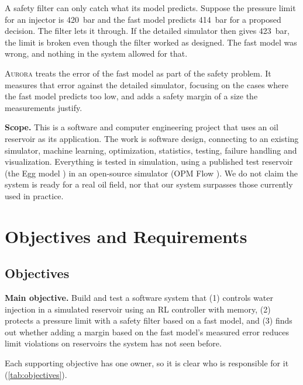 \documentclass[11pt,letterpaper]{article}
\newcommand{\aur}{\textsc{Aurora}}
\begin{document}
\begin{keybox}[title=The problem this project addresses.]
A safety filter can only catch what its model predicts. Suppose the pressure limit for an
injector is \SI{420}{\bar} and the fast model predicts \SI{414}{\bar} for a proposed
decision. The filter lets it through. If the detailed simulator then gives \SI{423}{\bar},
the limit is broken even though the filter worked as designed. The fast model was wrong,
and nothing in the system allowed for that.
\end{keybox}

\aur{} treats the error of the fast model as part of the safety problem. It measures that
error against the detailed simulator, focusing on the cases where the fast model predicts
too low, and adds a safety margin of a size the measurements justify.

\textbf{Scope.} This is a software and computer engineering project that uses an oil
reservoir as its application. The work is software design, connecting to an existing
simulator, machine learning, optimization, statistics, testing, failure handling and
visualization. Everything is tested in simulation, using a published test reservoir (the
Egg model \cite{jansen2014egg}) in an open-source simulator (OPM Flow
\cite{rasmussen2021opm}). We do not claim the system is ready for a real oil field, nor 
that our system surpasses those currently used in practice.

\section{Objectives and Requirements}\label{sec:req}

\subsection{Objectives}

\textbf{Main objective.} Build and test a software system that (1) controls water injection
in a simulated reservoir using an RL controller with memory, (2) protects a pressure limit
with a safety filter based on a fast model, and (3) finds out whether adding a margin based
on the fast model's measured error reduces limit violations on reservoirs the system has
not seen before.

Each supporting objective has one owner, so it is clear who is responsible for it
(\cref{tab:objectives}).
\end{document}
